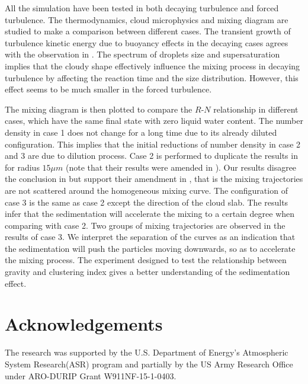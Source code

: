 \documentclass[draft,jgrga]{AGUTeX}
\begin{document}
\begin{article}
All the simulation have been tested in both decaying turbulence and forced turbulence. The thermodynamics, cloud microphysics and mixing diagram are studied to make a comparison between different cases. The transient growth of turbulence kinetic energy due to buoyancy effects in the decaying cases agrees with the observation in \cite{Kumar14}. The spectrum of droplets size and supersaturation implies that the cloudy shape effectively influence the mixing process in decaying turbulence by affecting the reaction time and the size distribution. However, this effect seems to be much smaller in the forced turbulence.

The mixing diagram is then plotted to compare the $R$-$N$ relationship in different cases, which have the same final state with zero liquid water content. The number density in case 1 does not change for a long time due to its already diluted configuration. This implies that the initial reductions of number density in case 2 and 3 are due to dilution process. Case 2 is performed to duplicate the results in \cite{Kumar14} for radius $15\mu m$ (note that their results were amended in \cite{Kumar16Corr}). Our results disagree the conclusion in \cite{Kumar14} but support their amendment in \cite{Kumar16Corr}, that is the mixing trajectories are not scattered around the homogeneous mixing curve. The configuration of case 3 is the same as case 2 except the direction of the cloud slab. The results infer that the sedimentation will accelerate the mixing to a certain degree when comparing with case 2. Two groups of mixing trajectories are observed in the results of case 3. We interpret the separation of the curves as an indication that the sedimentation will push the particles moving downwards, so as to accelerate the mixing process. The experiment designed to test the relationship between gravity and clustering index gives a better understanding of the sedimentation effect.

\section{Acknowledgements}
The research was supported by the U.S. Department of Energy's Atmospheric System Research(ASR) program and partially by the US Army Research Office under ARO-DURIP Grant W911NF-15-1-0403.



\end{article}
\end{document}
